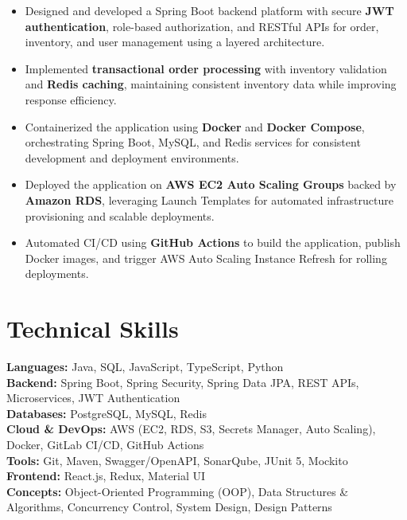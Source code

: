 \documentclass[10pt,a4paper]{article}
\begin{document}
\begin{itemize}

\item Designed and developed a Spring Boot backend platform with secure \textbf{JWT authentication}, role-based authorization, and RESTful APIs for order, inventory, and user management using a layered architecture.

\item Implemented \textbf{transactional order processing} with inventory validation and \textbf{Redis caching}, maintaining consistent inventory data while improving response efficiency.

\item Containerized the application using \textbf{Docker} and \textbf{Docker Compose}, orchestrating Spring Boot, MySQL, and Redis services for consistent development and deployment environments.

\item Deployed the application on \textbf{AWS EC2 Auto Scaling Groups} backed by \textbf{Amazon RDS}, leveraging Launch Templates for automated infrastructure provisioning and scalable deployments.

\item Automated CI/CD using \textbf{GitHub Actions} to build the application, publish Docker images, and trigger AWS Auto Scaling Instance Refresh for rolling deployments.

\end{itemize}

\section*{Technical Skills}

\textbf{Languages:} Java, SQL, JavaScript, TypeScript, Python \\
\textbf{Backend:} Spring Boot, Spring Security, Spring Data JPA, REST APIs, Microservices, JWT Authentication \\
\textbf{Databases:} PostgreSQL, MySQL, Redis \\
\textbf{Cloud \& DevOps:} AWS (EC2, RDS, S3, Secrets Manager, Auto Scaling), Docker, GitLab CI/CD, GitHub Actions \\
\textbf{Tools:} Git, Maven, Swagger/OpenAPI, SonarQube, JUnit 5, Mockito \\
\textbf{Frontend:} React.js, Redux, Material UI \\
\textbf{Concepts:} Object-Oriented Programming (OOP), Data Structures \& Algorithms, Concurrency Control, System Design, Design Patterns
\end{document}
